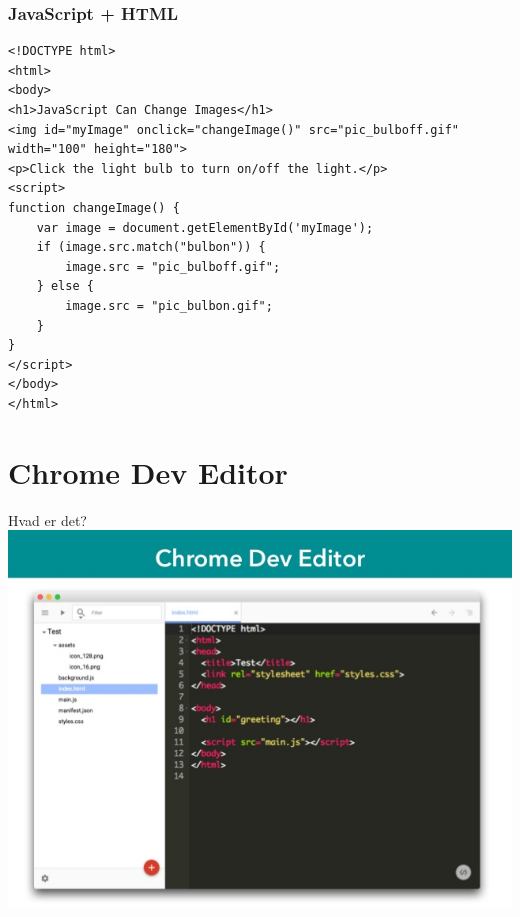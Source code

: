 \documentclass[10pt]{beamer}
\begin{document}

\begin{frame}[fragile]
 \frametitle{JavaScript + HTML}
\begin{lstlisting}
<!DOCTYPE html>
<html>
<body>
<h1>JavaScript Can Change Images</h1>
<img id="myImage" onclick="changeImage()" src="pic_bulboff.gif" width="100" height="180">
<p>Click the light bulb to turn on/off the light.</p>
<script>
function changeImage() {
    var image = document.getElementById('myImage');
    if (image.src.match("bulbon")) {
        image.src = "pic_bulboff.gif";
    } else {
        image.src = "pic_bulbon.gif";
    }
}
</script>
</body>
</html>
\end{lstlisting}
\end{frame}


\section{Chrome Dev Editor}


\begin{frame}{Hvad er det?}
		\includegraphics[width=\linewidth]{img/chromedeveditor.jpg}
\end{frame}

\end{document}
